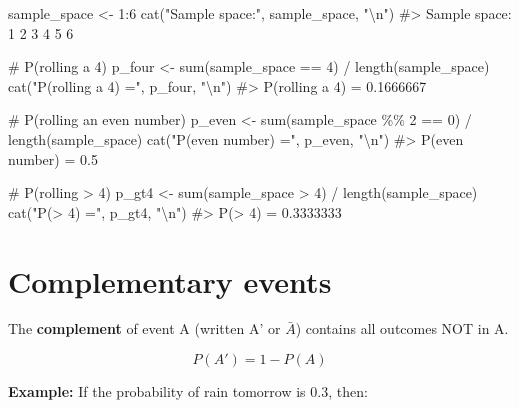 \documentclass[
  11pt,
  a4paper,
  oneside,
  open=any]{scrbook}
\newenvironment{Shaded}{\begin{snugshade}}{\end{snugshade}}
\newcommand{\CommentTok}[1]{\textcolor[rgb]{0.37,0.37,0.37}{#1}}
\newcommand{\DecValTok}[1]{\textcolor[rgb]{0.68,0.00,0.00}{#1}}
\newcommand{\FunctionTok}[1]{\textcolor[rgb]{0.28,0.35,0.67}{#1}}
\newcommand{\NormalTok}[1]{\textcolor[rgb]{0.00,0.23,0.31}{#1}}
\newcommand{\OtherTok}[1]{\textcolor[rgb]{0.00,0.23,0.31}{#1}}
\newcommand{\SpecialCharTok}[1]{\textcolor[rgb]{0.37,0.37,0.37}{#1}}
\newcommand{\StringTok}[1]{\textcolor[rgb]{0.13,0.47,0.30}{#1}}
\begin{document}
\begin{Shaded}
\begin{Highlighting}[]
\NormalTok{sample\_space }\OtherTok{\textless{}{-}} \DecValTok{1}\SpecialCharTok{:}\DecValTok{6}
\FunctionTok{cat}\NormalTok{(}\StringTok{"Sample space:"}\NormalTok{, sample\_space, }\StringTok{"}\SpecialCharTok{\textbackslash{}n}\StringTok{"}\NormalTok{)}
\CommentTok{\#\textgreater{} Sample space: 1 2 3 4 5 6}

\CommentTok{\# P(rolling a 4)}
\NormalTok{p\_four }\OtherTok{\textless{}{-}} \FunctionTok{sum}\NormalTok{(sample\_space }\SpecialCharTok{==} \DecValTok{4}\NormalTok{) }\SpecialCharTok{/} \FunctionTok{length}\NormalTok{(sample\_space)}
\FunctionTok{cat}\NormalTok{(}\StringTok{"P(rolling a 4) ="}\NormalTok{, p\_four, }\StringTok{"}\SpecialCharTok{\textbackslash{}n}\StringTok{"}\NormalTok{)}
\CommentTok{\#\textgreater{} P(rolling a 4) = 0.1666667}

\CommentTok{\# P(rolling an even number)}
\NormalTok{p\_even }\OtherTok{\textless{}{-}} \FunctionTok{sum}\NormalTok{(sample\_space }\SpecialCharTok{\%\%} \DecValTok{2} \SpecialCharTok{==} \DecValTok{0}\NormalTok{) }\SpecialCharTok{/} \FunctionTok{length}\NormalTok{(sample\_space)}
\FunctionTok{cat}\NormalTok{(}\StringTok{"P(even number) ="}\NormalTok{, p\_even, }\StringTok{"}\SpecialCharTok{\textbackslash{}n}\StringTok{"}\NormalTok{)}
\CommentTok{\#\textgreater{} P(even number) = 0.5}

\CommentTok{\# P(rolling \textgreater{} 4)}
\NormalTok{p\_gt4 }\OtherTok{\textless{}{-}} \FunctionTok{sum}\NormalTok{(sample\_space }\SpecialCharTok{\textgreater{}} \DecValTok{4}\NormalTok{) }\SpecialCharTok{/} \FunctionTok{length}\NormalTok{(sample\_space)}
\FunctionTok{cat}\NormalTok{(}\StringTok{"P(\textgreater{} 4) ="}\NormalTok{, p\_gt4, }\StringTok{"}\SpecialCharTok{\textbackslash{}n}\StringTok{"}\NormalTok{)}
\CommentTok{\#\textgreater{} P(\textgreater{} 4) = 0.3333333}
\end{Highlighting}
\end{Shaded}

\section{Complementary events}\label{complementary-events}

The \textbf{complement} of event A (written A' or \(\bar{A}\)) contains
all outcomes NOT in A.

\[P(A') = 1 - P(A)\]

\textbf{Example:} If the probability of rain tomorrow is 0.3, then:
\end{document}
